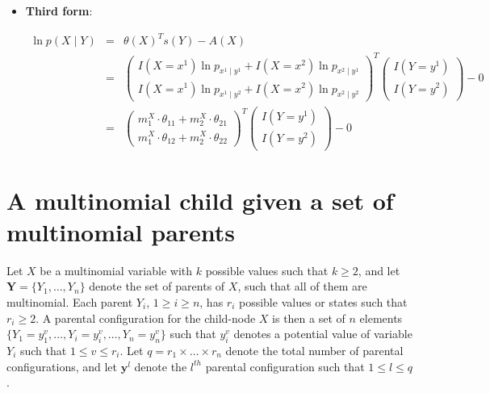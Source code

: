 \documentclass[11pt, oneside]{article}   	%
\numberwithin{figure}{section}
\numberwithin{equation}{section}
\numberwithin{table}{section}
\begin{document}
\begin{itemize}
\item \textbf{Third form}:

\begin{eqnarray*}
\ln p(X \mid Y) &=& \theta(X)^T s(Y) - A(X) \\
&=&
\begin{pmatrix}
I(X=x^1)\ln p_{x^1 \mid y^1}  + I(X=x^2)\ln p_{x^2 \mid y^1}\\
I(X=x^1)\ln p_{x^1 \mid y^2}  + I(X=x^2)\ln p_{x^2 \mid y^2}
\end{pmatrix}^T
\begin{pmatrix}
I(Y=y^1) \\
I(Y=y^2)
\end{pmatrix}
- 0\\
&=&
\begin{pmatrix}
m^X_1 \cdot \theta_{11}  +  m^X_2\cdot \theta_{21}\\
m^X_1 \cdot \theta_{12}  + m^X_2 \cdot \theta_{22}
\end{pmatrix}^T
\begin{pmatrix}
I(Y=y^1) \\
I(Y=y^2)
\end{pmatrix}
- 0
\end{eqnarray*}

\end{itemize}

\newpage
\section{A multinomial child given a set of multinomial parents}

Let $X$ be a multinomial variable with $k$ possible values such that $k \geq 2$, and let $\mathbf{Y} =\{Y_1,\ldots,Y_n\}$ denote the set of parents of $X$, such that all of them are multinomial. Each parent $Y_i$, $1 \geq i \geq n$, has $r_i$ possible values or states such that $r_i \geq 2$. A parental configuration for the child-node $X$ is then a set of $n$ elements $\{Y_1 = y_1^{v}, \ldots, Y_i = y_i^{v},\ldots, Y_n = y_n^{v} \}$ such that $y_i^{v}$ denotes a potential value of variable $Y_i$ such that  $1 \leq v \leq r_i$. Let $q = r_1 \times \ldots \times r_n$ denote the total number of parental configurations, and let $\mathbf{y}^l$ denote the $l^{th}$ parental configuration such that $1 \leq l \leq q$.
\end{document}
